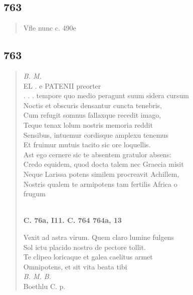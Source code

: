 \documentclass[11pt, a4paper]{report}
\begin{document}
            \subsection*{763}
      \begin{verse}
      Vfle nunc c. 490e \\ 
      \end{verse}
  
            \subsection*{763}
      \begin{verse}
      \textit{B. M.} \\ EL . e PATENII preorter \\ . . . tempore quo medio peragunt suum sidera cursum \\ Noctis et obscuris densantur cuncta tenebris, \\ Cum refugit somnus fallaxque recedit imago, \\ Teque tenax lolum nostris memoria reddit \\ Sensibus, intuemur cordisque amplexu tenemus \\ Et fruimur mutuis tacito sic ore loquellis. \\ Ast ego cernere sic te absentem gratulor absens: \\ Credo equidem, quod docta talem nec Graecia misit \\ Neque Larissa potens similem procreavit Achillem, \\ Nostris qualem  \lbrack te \rbrack  armipotens tam fertilis Africa o \\ frugum \\ 
        ﻿\pagebreak 
    \begin{center} \textbf{C. 76a, I11. C. 764 764a, 13} \end{center} \marginpar{[01]} Vexit ad astra virum. Quem claro lumine fulgens \\ Sol ictu placido nostro de pectore tollit. \\ Te clipeo loricaque et galea caelitus armet \\ Omnipotens, et sit vita beata tibi \\ \textit{B. M. B.} \\ Boethlu C. p. \\ 
      \end{verse}
  
\end{document}
